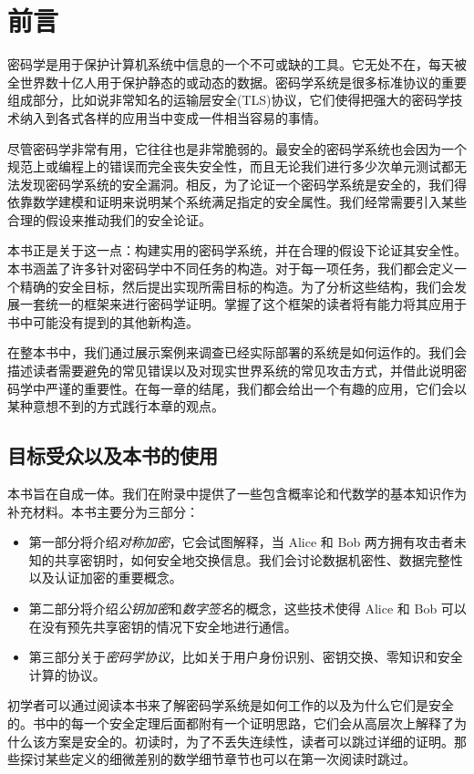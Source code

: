 \chapter*{前言}

密码学是用于保护计算机系统中信息的一个不可或缺的工具。它无处不在，每天被全世界数十亿人用于保护静态的或动态的数据。密码学系统是很多标准协议的重要组成部分，比如说非常知名的运输层安全(TLS)协议，它们使得把强大的密码学技术纳入到各式各样的应用当中变成一件相当容易的事情。

尽管密码学非常有用，它往往也是非常脆弱的。最安全的密码学系统也会因为一个规范上或编程上的错误而完全丧失安全性，而且无论我们进行多少次单元测试都无法发现密码学系统的安全漏洞。相反，为了论证一个密码学系统是安全的，我们得依靠数学建模和证明来说明某个系统满足指定的安全属性。我们经常需要引入某些合理的假设来推动我们的安全论证。

本书正是关于这一点：构建实用的密码学系统，并在合理的假设下论证其安全性。本书涵盖了许多针对密码学中不同任务的构造。对于每一项任务，我们都会定义一个精确的安全目标，然后提出实现所需目标的构造。为了分析这些结构，我们会发展一套统一的框架来进行密码学证明。掌握了这个框架的读者将有能力将其应用于书中可能没有提到的其他新构造。

在整本书中，我们通过展示案例来调查已经实际部署的系统是如何运作的。我们会描述读者需要避免的常见错误以及对现实世界系统的常见攻击方式，并借此说明密码学中严谨的重要性。在每一章的结尾，我们都会给出一个有趣的应用，它们会以某种意想不到的方式践行本章的观点。
\section*{目标受众以及本书的使用}

本书旨在自成一体。我们在附录中提供了一些包含概率论和代数学的基本知识作为补充材料。本书主要分为三部分：
\begin{itemize}
	\item 第一部分将介绍\emph{对称加密}，它会试图解释，当 Alice 和 Bob 两方拥有攻击者未知的共享密钥时，如何安全地交换信息。我们会讨论数据机密性、数据完整性以及认证加密的重要概念。
	\item 第二部分将介绍\emph{公钥加密}和\emph{数字签名}的概念，这些技术使得 Alice 和 Bob 可以在没有预先共享密钥的情况下安全地进行通信。
	\item 第三部分关于\emph{密码学协议}，比如关于用户身份识别、密钥交换、零知识和安全计算的协议。
\end{itemize}

初学者可以通过阅读本书来了解密码学系统是如何工作的以及为什么它们是安全的。书中的每一个安全定理后面都附有一个证明思路，它们会从高层次上解释了为什么该方案是安全的。初读时，为了不丢失连续性，读者可以跳过详细的证明。那些探讨某些定义的细微差别的数学细节章节也可以在第一次阅读时跳过。

